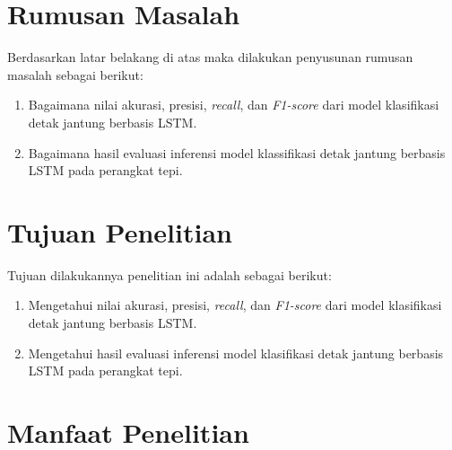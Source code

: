 \section{Rumusan Masalah}

Berdasarkan latar belakang di atas maka dilakukan penyusunan rumusan masalah sebagai berikut:

\begin{enumerate}
  \item Bagaimana nilai akurasi, presisi, \emph{recall}, dan \emph{F1-score} dari model klasifikasi detak jantung berbasis LSTM.
  \item Bagaimana hasil evaluasi inferensi model klassifikasi detak jantung berbasis LSTM pada perangkat tepi.
\end{enumerate}


\section{Tujuan Penelitian}
Tujuan dilakukannya penelitian ini adalah sebagai berikut:

\begin{enumerate}
  \item Mengetahui nilai akurasi, presisi, \emph{recall}, dan \emph{F1-score} dari model klasifikasi detak jantung berbasis LSTM.
  \item Mengetahui hasil evaluasi inferensi model klasifikasi detak jantung berbasis LSTM pada perangkat tepi.
\end{enumerate}


\section{Manfaat Penelitian}


